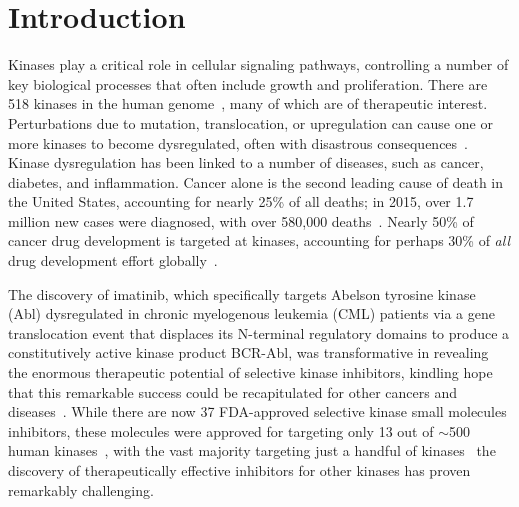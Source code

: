 \documentclass[9pt,lineno]{elife}
\begin{document}
\section{Introduction}

Kinases play a critical role in cellular signaling pathways, controlling a number of key biological processes that often include growth and proliferation. 
There are 518 kinases in the human genome~\citep{manning:science:2002:kinome}, many of which are of therapeutic interest.
Perturbations due to mutation, translocation, or upregulation can cause one or more kinases to become dysregulated, often with disastrous consequences~\citep{knight_targeting_2010}.
Kinase dysregulation has been linked to a number of diseases, such as cancer, diabetes, and inflammation.
Cancer alone is the second leading cause of death in the United States, accounting for nearly 25\% of all deaths; in 2015, over 1.7 million new cases were diagnosed, with over 580,000 deaths~\citep{acs-cancer-facts-2015}. 
Nearly 50\% of cancer drug development is targeted at kinases, accounting for perhaps 30\% of \emph{all} drug development effort globally~\citep{cohen_will_2010,Santos:Nat.Rev.DrugDiscov.:2016}. 

The discovery of imatinib, which specifically targets Abelson tyrosine kinase (Abl) dysregulated in chronic myelogenous leukemia (CML) patients via a gene translocation event that displaces its N-terminal regulatory domains to produce a constitutively active kinase product BCR-Abl, was transformative in revealing the enormous therapeutic potential of selective kinase inhibitors, kindling hope that this remarkable success could be recapitulated for other cancers and diseases~\citep{stegmeier:clpt:2010:imatinib-lessons}.
While there are now 37 FDA-approved selective kinase small molecules inhibitors, these molecules were approved for targeting only 13 out of $\sim$500 human kinases~\citep{wu_fda-approved_2015,fda-approved-kinase-inhibitors}, with the vast majority targeting just a handful of kinases~\citep{doi:10.1021/ci500624s} 
the discovery of therapeutically effective inhibitors for other kinases has proven remarkably challenging.
\end{document}
